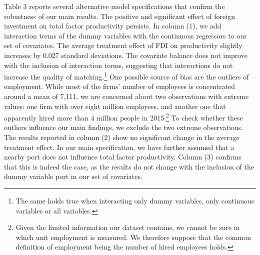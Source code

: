 \documentclass[a4paper,11pt]{scrartcl}
\begin{document}
Table 3 reports several alternative model specifications that confirm the robustness of our main results. The positive and significant effect of foreign investment on total factor productivity persists. In column (1), we add interaction terms of the dummy variables with the continuous regressors to our set of covariates. The average treatment effect of FDI on productivity slightly increases by 0.027 standard deviations. The covariate balance does not improve with the inclusion of interaction terms, suggesting that interactions do not increase the quality of matching.\footnote{The same holds true when interacting only dummy variables, only continuous variables or all variables.} One possible source of bias are the outliers of employment. While most of the firms' number of employees is concentrated around a mean of 7,111, we are concerned about two observations with extreme values: one firm with over eight million employees, and another one that apparently hired more than 4 million people in 2015.\footnote{Given the limited information our dataset contains, we cannot be sure in which unit employment is measured. We therefore suppose that the common definition of employment being the number of hired employees holds.}  To check whether these outliers influence our main findings, we exclude the two extreme observations. The results reported in column (2) show no significant change in the average treatment effect. %
In our main specification, we have further assumed that a nearby port does not influence total factor productivity. Column (3) confirms that this is indeed the case, as the results do not change with the inclusion of the dummy variable port in our set of covariates. 
\end{document}
